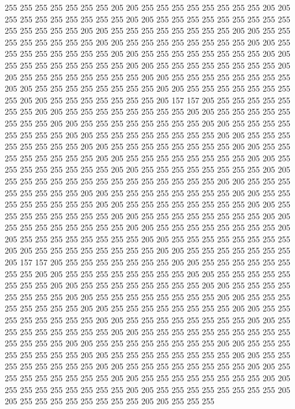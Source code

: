 255 255 255 255 255 255 255 205 205 255 255 255 255 255 255 255 255 205 205 255
255 255 255 255 255 255 255 205 205 255 255 255 255 255 255 255 255 255 255 255
255 255 255 205 205 255 255 255 255 255 255 255 255 205 205 255 255 255 255 255
255 255 255 205 205 255 255 255 255 255 255 255 255 205 205 255 255 255 255 255
255 255 255 205 205 255 255 255 255 255 255 255 255 205 205 255 255 255 255 255
255 255 255 205 205 255 255 255 255 255 255 255 255 205 205 255 255 255 255 255
255 255 255 205 205 255 255 255 255 255 255 255 255 205 205 255 255 255 255 255
255 255 255 205 205 255 255 255 255 255 255 255 255 205 205 255 255 255 255 255
255 255 205 157 157 205 255 255 255 255 255 255 255 205 205 255 255 255 255 255
255 255 255 205 205 255 255 255 255 255 255 255 255 205 205 255 255 255 255 255
255 255 255 205 205 255 255 255 255 255 255 255 255 205 205 255 255 255 255 255
255 255 255 205 205 255 255 255 255 255 255 255 255 205 205 255 255 255 255 255
255 255 255 205 205 255 255 255 255 255 255 255 255 205 205 255 255 255 255 255
255 255 255 205 205 255 255 255 255 255 255 255 255 205 205 255 255 255 255 255
255 255 255 205 205 255 255 255 255 255 255 255 255 255 255 255 255 255 255 205
205 255 255 255 255 255 255 255 255 205 205 255 255 255 255 255 255 255 255 205
205 255 255 255 255 255 255 255 255 205 205 255 255 255 255 255 255 255 255 205
205 255 255 255 255 255 255 255 255 205 205 255 255 255 255 255 255 255 255 205
205 255 255 255 255 255 255 255 255 205 205 255 255 255 255 255 255 255 255 205
205 255 255 255 255 255 255 255 255 205 205 255 255 255 255 255 255 255 255 205
205 255 255 255 255 255 255 255 255 205 205 255 255 255 255 255 255 255 205 157
157 205 255 255 255 255 255 255 255 205 205 255 255 255 255 255 255 255 255 205
205 255 255 255 255 255 255 255 255 205 205 255 255 255 255 255 255 255 255 205
205 255 255 255 255 255 255 255 255 205 205 255 255 255 255 255 255 255 255 205
205 255 255 255 255 255 255 255 255 205 205 255 255 255 255 255 255 255 255 205
205 255 255 255 255 255 255 255 255 205 205 255 255 255 255 255 255 255 255 205
205 255 255 255 255 255 255 255 255 205 205 255 255 255 255 255 255 255 255 205
205 255 255 255 255 255 255 255 255 255 255 255 255 255 255 205 205 255 255 255
255 255 255 255 255 205 205 255 255 255 255 255 255 255 255 205 205 255 255 255
255 255 255 255 255 205 205 255 255 255 255 255 255 255 255 205 205 255 255 255
255 255 255 255 255 205 205 255 255 255 255 255 255 255 255 205 205 255 255 255
255 255 255 255 255 205 205 255 255 255 255 255 255 255 255 205 205 255 255 255
255 255 255 255 255 205 205 255 255 255 255 255 255 255 255 205 205 255 255 255
